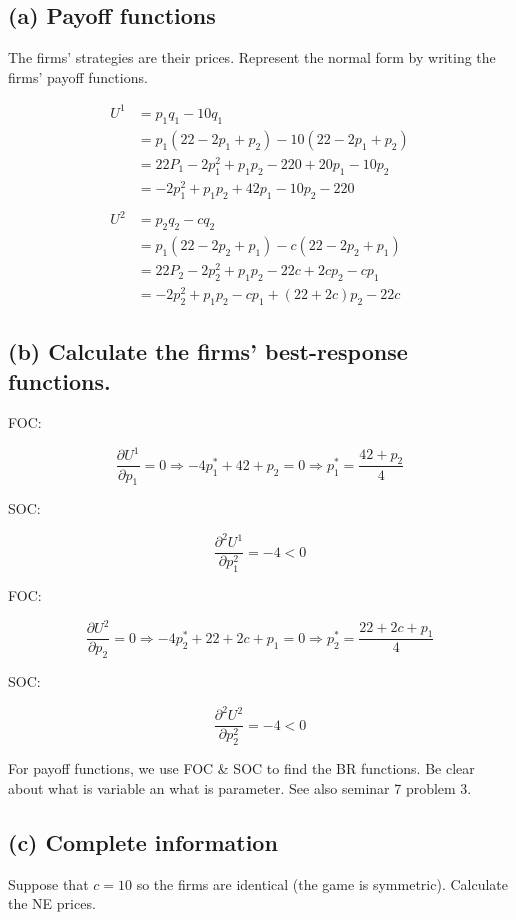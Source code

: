 \documentclass{article}
\begin{document}
\subsection*{(a) Payoff functions} The firms' strategies are their prices. Represent the normal form by writing the firms' payoff functions.

\begin{align*}
U^1 &= p_1 q_1 - 10 q_1 \\
&= p_1(22 - 2p_1 + p_2) -10(22 - 2p_1 + p_2) \\
&= 22P_1 -2p_1^2 + p_1p_2 - 220 + 20p_1 -10p_2 \\
&= -2p_1^2 +p_1p_2 + 42p_1 - 10p_2 -220\\
\\
U^2 &= p_2 q_2 - c q_2 \\
&= p_1(22 - 2p_2 + p_1) -c(22 - 2p_2 + p_1) \\
&= 22P_2 -2p_2^2 + p_1p_2 - 22c + 2cp_2 -cp_1 \\
&= -2p_2^2 +p_1p_2 -cp_1 + (22+2c)p_2 -22c
\end{align*}

\subsection*{(b) Calculate the firms' best-response functions.} 

FOC:

$$\frac{\partial U^1}{\partial p_1} = 0 \Rightarrow -4p^*_1+42+p_2 = 0 \Rightarrow p^*_1 = \frac{42+p_2}{4}$$

SOC:

$$\frac{\partial^2 U^1}{\partial p^2_1} = -4 <0$$

FOC:

$$\frac{\partial U^2}{\partial p_2} = 0 \Rightarrow -4p^*_2+22+2c+p_1 = 0 \Rightarrow p^*_2 = \frac{22+2c+p_1}{4}$$

SOC:

$$\frac{\partial^2 U^2}{\partial p^2_2} = -4 <0$$

\begin{mdframed}[backgroundcolor=blue!20,linecolor=white]
For payoff functions, we use FOC \& SOC to find the BR functions. Be clear about what is variable an what is parameter. See also seminar 7 problem 3.
\end{mdframed}

\subsection*{(c) Complete information} Suppose that $c = 10$ so the firms are identical (the game is symmetric). Calculate the NE prices.
\end{document}
